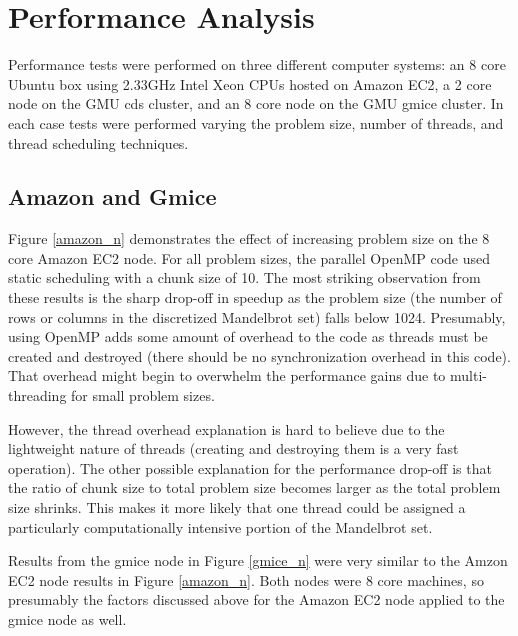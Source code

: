 \documentclass{article}
\begin{document}
\section{Performance Analysis}

Performance tests were performed on three different computer systems: an 8 core Ubuntu box using 2.33GHz Intel Xeon CPUs hosted on Amazon EC2, a 2 core node on the GMU cds cluster, and an 8 core node on the GMU gmice cluster. In each case tests were performed varying the problem size, number of threads, and thread scheduling techniques.

\subsection{Amazon and Gmice}

Figure \ref{amazon_n} demonstrates the effect of increasing problem size on the 8 core Amazon EC2 node. For all problem sizes, the parallel OpenMP code used static scheduling with a chunk size of 10. The most striking observation from these results is the sharp drop-off in speedup as the problem size (the number of rows or columns in the discretized Mandelbrot set) falls below 1024. Presumably, using OpenMP adds some amount of overhead to the code as threads must be created and destroyed (there should be no synchronization overhead in this code). That overhead might begin to overwhelm the performance gains due to multi-threading for small problem sizes. 

However, the thread overhead explanation is hard to believe due to the lightweight nature of threads (creating and destroying them is a very fast operation). The other possible explanation for the performance drop-off is that the ratio of chunk size to total problem size becomes larger as the total problem size shrinks. This makes it more likely that one thread could be assigned a particularly computationally intensive portion of the Mandelbrot set.

Results from the gmice node in Figure \ref{gmice_n} were very similar to the Amzon EC2 node results in Figure \ref{amazon_n}. Both nodes were 8 core machines, so presumably the factors discussed above for the Amazon EC2 node applied to the gmice node as well.
\end{document}
